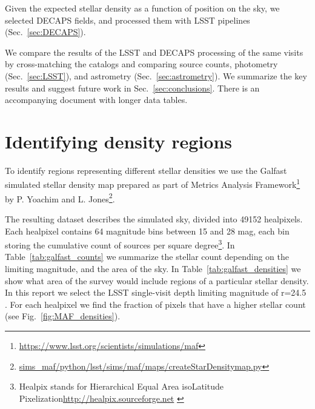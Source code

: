 \documentclass[DM,lsstdraft,toc,usenatbib,authoryear]{lsstdoc}
\begin{document}
Given the expected stellar density as a function of position on the sky, we selected DECAPS fields, and processed them with LSST pipelines (Sec.~\ref{sec:DECAPS}).

We compare the results of the LSST and DECAPS processing of the same visits by cross-matching the catalogs and comparing source counts, photometry (Sec.~\ref{sec:LSST}), and astrometry (Sec.~\ref{sec:astrometry}). We summarize the key results and suggest future work in Sec.~\ref{sec:conclusions}. There is an accompanying document with longer data tables.




\section{Identifying density regions}
\label{sec:MAF}
To identify regions representing different stellar densities we use the Galfast simulated stellar density map
prepared as part of Metrics Analysis Framework\footnote{\url{https://www.lsst.org/scientists/simulations/maf}} by P. Yoachim and L. Jones\footnote{\url{sims_maf/python/lsst/sims/maf/maps/createStarDensitymap.py}}.

The  resulting dataset describes the simulated sky, divided into 49152 healpixels. Each healpixel contains 64 magnitude bins between 15 and 28 mag, each bin storing the cumulative count of sources per square degree\footnote{Healpix stands for Hierarchical Equal Area isoLatitude Pixelization\url{http://healpix.sourceforge.net} \citep{gorski2005}}.  In Table~\ref{tab:galfast_counts} we summarize the stellar count depending on the limiting magnitude, and the area of the sky. In Table~\ref{tab:galfast_densities} we show what area of the survey would include regions of a particular stellar density. In this report  we select the  LSST single-visit depth limiting magnitude of r=24.5 . For each healpixel we find the fraction of pixels that have a higher stellar count (see Fig.~\ref{fig:MAF_densities}).
\end{document}
